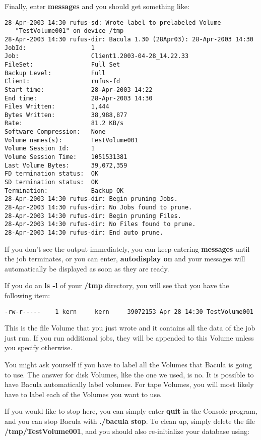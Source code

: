 {{Finally, enter {\bf messages} and you should get something like: 

\footnotesize
\begin{verbatim}
28-Apr-2003 14:30 rufus-sd: Wrote label to prelabeled Volume
   "TestVolume001" on device /tmp
28-Apr-2003 14:30 rufus-dir: Bacula 1.30 (28Apr03): 28-Apr-2003 14:30
JobId:                  1
Job:                    Client1.2003-04-28_14.22.33
FileSet:                Full Set
Backup Level:           Full
Client:                 rufus-fd
Start time:             28-Apr-2003 14:22
End time:               28-Apr-2003 14:30
Files Written:          1,444
Bytes Written:          38,988,877
Rate:                   81.2 KB/s
Software Compression:   None
Volume names(s):        TestVolume001
Volume Session Id:      1
Volume Session Time:    1051531381
Last Volume Bytes:      39,072,359
FD termination status:  OK
SD termination status:  OK
Termination:            Backup OK
28-Apr-2003 14:30 rufus-dir: Begin pruning Jobs.
28-Apr-2003 14:30 rufus-dir: No Jobs found to prune.
28-Apr-2003 14:30 rufus-dir: Begin pruning Files.
28-Apr-2003 14:30 rufus-dir: No Files found to prune.
28-Apr-2003 14:30 rufus-dir: End auto prune.
\end{verbatim}
\normalsize

If you don't see the output immediately, you can keep entering {\bf messages}
until the job terminates, or you can enter, {\bf autodisplay on} and your
messages will automatically be displayed as soon as they are ready. 

If you do an {\bf ls -l} of your {\bf /tmp} directory, you will see that you
have the following item: 

\footnotesize
\begin{verbatim}
-rw-r-----    1 kern     kern     39072153 Apr 28 14:30 TestVolume001
\end{verbatim}
\normalsize

This is the file Volume that you just wrote and it contains all the data of
the job just run. If you run additional jobs, they will be appended to this
Volume unless you specify otherwise. 

You might ask yourself if you have to label all the Volumes that Bacula is
going to use. The answer for disk Volumes, like the one we used, is no. It is
possible to have Bacula automatically label volumes. For tape Volumes, you
will most likely have to label each of the Volumes you want to use. 

If you would like to stop here, you can simply enter {\bf quit} in the Console
program, and you can stop Bacula with {\bf ./bacula stop}. To clean up, simply
delete the file {\bf /tmp/TestVolume001}, and you should also re-initialize
your database using: 

}}

